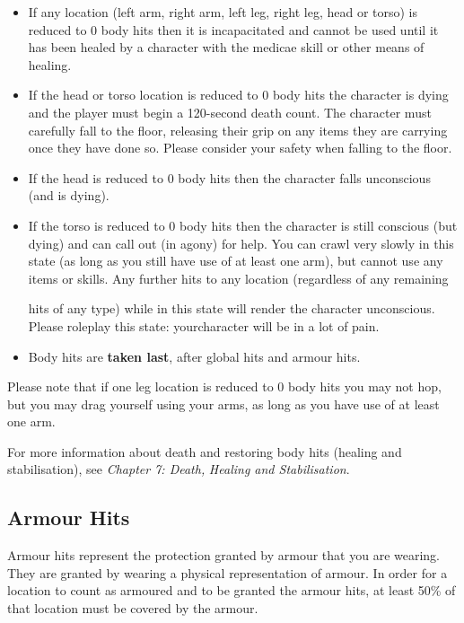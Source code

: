 \documentclass{scrbook}
\begin{document}
\begin{itemize}
\item If any location (left arm, right arm, left leg, right leg, head or torso) is reduced to 0 body hits then it is incapacitated and cannot be used until it has been healed by a character with the medicae skill or other means of healing.

\item If the head or torso location is reduced to 0 body hits the character is dying and the player must begin a 120-second death count. The character must carefully fall to the floor, releasing their grip on any items they are carrying once they have done so. Please consider your safety when falling to the floor.

\item If the head is reduced to 0 body hits then the character falls unconscious (and is dying).

\item If the torso is reduced to 0 body hits then the character is still conscious (but dying) and can call out (in agony) for help. You can crawl very slowly in this state (as long as you still have use of at least one arm), but cannot use any items or skills. Any further hits to any location (regardless of any remaining

hits of any type) while in this state will render the character unconscious. Please roleplay this state: yourcharacter will be in a lot of pain.

\item Body hits are \textbf{taken last}, after global hits and armour hits.

\end{itemize}
Please note that if one leg location is reduced to 0 body hits you may not hop, but you may drag yourself using your arms, as long as you have use of at least one arm.

For more information about death and restoring body hits (healing and stabilisation), see \textit{Chapter 7: Death,} \textit{Healing and Stabilisation}.

\subsection{Armour Hits}

Armour hits represent the protection granted by armour that you are wearing. They are granted by wearing a physical representation of armour. In order for a location to count as armoured and to be granted the armour hits, at least 50\% of that location must be covered by the armour.
\end{document}
